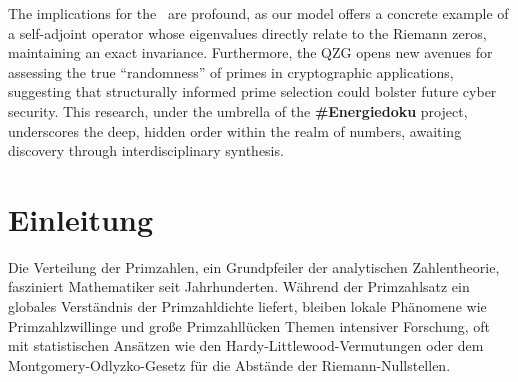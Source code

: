\documentclass[11pt,a4paper]{article}
\newcommand{\entropy}{S}
\newcommand{\formfactor}{\mathcal{Q}}
\newcommand{\pressure}{P}
\newcommand{\temperature}{T}
\newcommand{\bamberger}{\Phi}
\newcommand{\HilPol}{\text{Hilbert-Pólya-Hypothese}}
\theoremstyle{definition}
\begin{document}
The implications for the \HilPol\ are profound, as our model offers a concrete example of a self-adjoint operator whose eigenvalues directly relate to the Riemann zeros, maintaining an exact invariance. Furthermore, the QZG opens new avenues for assessing the true ``randomness'' of primes in cryptographic applications, suggesting that structurally informed prime selection could bolster future cyber security. This research, under the umbrella of the \textbf{\#Energiedoku} project, underscores the deep, hidden order within the realm of numbers, awaiting discovery through interdisciplinary synthesis.

\newpage
\begin{abstract}
Dieses Papier stellt die \textbf{Quaternionische Zustandsgleichung (QZG)} vor, einen neuartigen thermodynamischen Rahmen zum Verständnis der Primzahlverteilung. Abweichend von rein statistischen Ansätzen modellieren wir die nichttrivialen Nullstellen der Riemannschen Zeta-Funktion $t_k$ als Energieniveaus in einem quantenähnlichen System, dessen Wechselwirkungen durch die algebraische Struktur der Hamilton-Quaternionen gesteuert werden, die spezifisch mit den Modulo-12-Klassen der Primzahlen ($A, B, C$) verknüpft sind. Wir konstruieren einen lokalen, familienorientierten Dirac-Operator $D$, dessen Eigenwerte zeigen, dass eine exakte Invariante $t_k$ für eine gewählte zentrale Primzahl erhalten bleibt. Die abgeleitete QZG, $\pressure \cdot \exp\left(\frac{\entropy}{\formfactor}\right) = \bamberger \cdot \temperature$, korreliert die lokale Primzahldichte $\pressure$ mit der spektralen Entropie $\entropy$ und einem Quaternionen-Formfaktor $\formfactor$. Dieser Rahmen bietet neue Einblicke in die Primzahlkondensation (Primzahlzwillinge) und -expansion (große Lücken) und liefert eine mechanistische Erklärung für ihr Auftreten jenseits statistischer Durchschnitte. Wir untersuchen auch die Implikationen für die \HilPol\ und die praktische Robustheit kryptographischer Primitive wie RSA.
\end{abstract}

\section{Einleitung}
\label{sec:introduction_de}
Die Verteilung der Primzahlen, ein Grundpfeiler der analytischen Zahlentheorie, fasziniert Mathematiker seit Jahrhunderten. Während der Primzahlsatz ein globales Verständnis der Primzahldichte liefert, bleiben lokale Phänomene wie Primzahlzwillinge und große Primzahllücken Themen intensiver Forschung, oft mit statistischen Ansätzen wie den Hardy-Littlewood-Vermutungen oder dem Montgomery-Odlyzko-Gesetz für die Abstände der Riemann-Nullstellen.
\end{document}
